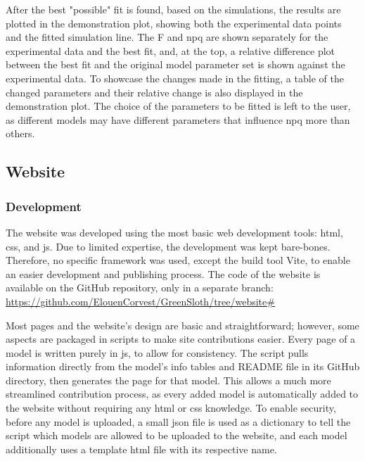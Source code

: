 After the best "possible" fit is found, based on the simulations, the results are plotted in the demonstration plot, showing both the experimental data points and the fitted simulation line. The \gls{F} and \gls{npq} are shown separately for the experimental data and the best fit, and, at the top, a relative difference plot between the best fit and the original model parameter set is shown against the experimental data. To showcase the changes made in the fitting, a table of the changed parameters and their relative change is also displayed in the demonstration plot. The choice of the parameters to be fitted is left to the user, as different models may have different parameters that influence \gls{npq} more than others.

\subsection{Website}

\subsubsection{Development}

The website was developed using the most basic web development tools: \gls{html}, \gls{css}, and \gls{js}. Due to limited expertise, the development was kept bare-bones. Therefore, no specific framework was used, except the build tool Vite, to enable an easier development and publishing process. The code of the website is available on the \greensloth{} GitHub repository, only in a separate branch: \url{https://github.com/ElouenCorvest/GreenSloth/tree/website#}

Most pages and the website's design are basic and straightforward; however, some aspects are packaged in scripts to make site contributions easier. Every page of a model is written purely in \gls{js}, to allow for consistency. The script pulls information directly from the model's info tables and README file in its GitHub directory, then generates the page for that model. This allows a much more streamlined contribution process, as every added model is automatically added to the website without requiring any \gls{html} or \gls{css} knowledge. To enable security, before any model is uploaded, a small \gls{json} file is used as a dictionary to tell the script which models are allowed to be uploaded to the website, and each model additionally uses a template \gls{html} file with its respective name.

